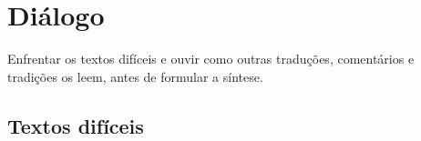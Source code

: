 \chapter{Diálogo}

\begin{objetivo}
Enfrentar os textos difíceis e ouvir como outras traduções, comentários e
tradições os leem, antes de formular a síntese.
\end{objetivo}

\section{Textos difíceis}
\textosdotema[peso=dificil]

